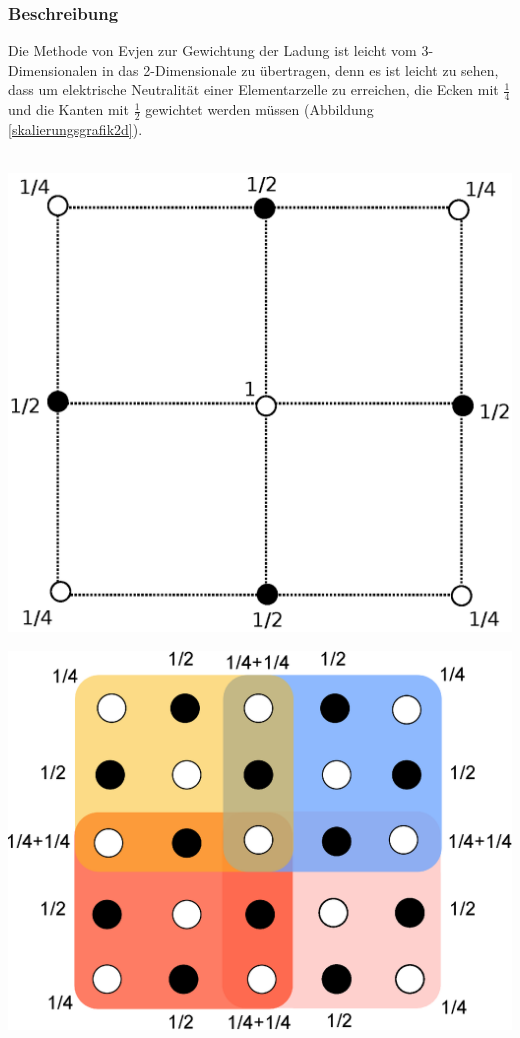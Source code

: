 \documentclass[10pt,a4paper]{article}
\begin{document}
\subsubsection{Beschreibung}
Die Methode von Evjen zur Gewichtung der Ladung ist leicht vom 3-Dimensionalen
in das 2-Dimensionale zu übertragen, denn es ist leicht zu sehen, dass um elektrische
Neutralität einer Elementarzelle zu erreichen, die Ecken mit $\frac{1}{4}$ und die Kanten mit
$\frac{1}{2}$ gewichtet werden müssen (Abbildung \ref{skalierungsgrafik2d}).
\\
\\
\begin{minipage}[c]{0.5\textwidth}
\begin{center}
\includegraphics[height=0.65\textwidth]{./figures/quadrat.eps}
\label{skalierungsgrafik2d}
\end{center}
\end{minipage}
\begin{minipage}[c]{0.5\textwidth}
\begin{center}
\includegraphics[height=0.65\textwidth]{./figures/elementarzelle.eps}
\label{zellensumme}
\end{center}
\end{minipage}
	
\end{document}
